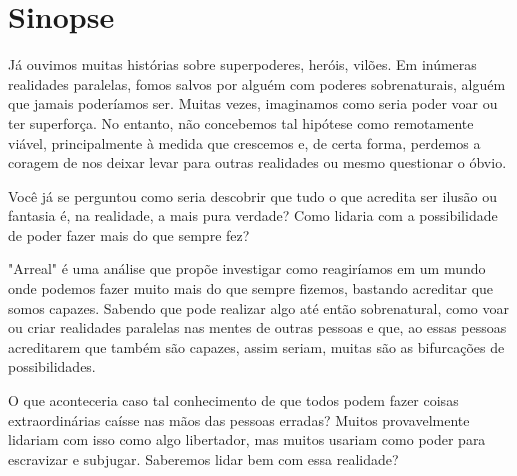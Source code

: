 \chapter*{Sinopse}

Já ouvimos muitas histórias sobre superpoderes, heróis, vilões. Em inúmeras realidades paralelas, fomos salvos por alguém com poderes sobrenaturais, alguém que jamais poderíamos ser. Muitas vezes, imaginamos como seria poder voar ou ter superforça. No entanto, não concebemos tal hipótese como remotamente viável, principalmente à medida que crescemos e, de certa forma, perdemos a coragem de nos deixar levar para outras realidades ou mesmo questionar o óbvio.

Você já se perguntou como seria descobrir que tudo o que acredita ser ilusão ou fantasia é, na realidade, a mais pura verdade? Como lidaria com a possibilidade de poder fazer mais do que sempre fez?

"Arreal" é uma análise que propõe investigar como reagiríamos em um mundo onde podemos fazer muito mais do que sempre fizemos, bastando acreditar que somos capazes. Sabendo que pode realizar algo até então sobrenatural, como voar ou criar realidades paralelas nas mentes de outras pessoas e que, ao essas pessoas acreditarem que também são capazes, assim seriam, muitas são as bifurcações de possibilidades.

O que aconteceria caso tal conhecimento de que todos podem fazer coisas extraordinárias caísse nas mãos das pessoas erradas? Muitos provavelmente lidariam com isso como algo libertador, mas muitos usariam como poder para escravizar e subjugar. Saberemos lidar bem com essa realidade?